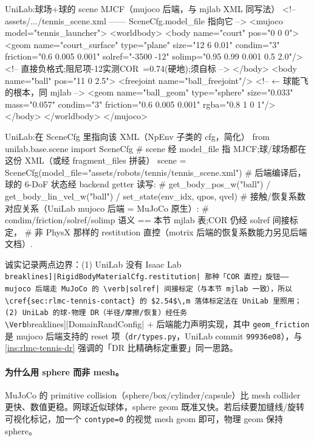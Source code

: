 \begin{codebox}[text]{UniLab:球场+球的 scene MJCF（mujoco 后端，与 mjlab XML 同写法）}
<!-- assets/.../tennis_scene.xml —— SceneCfg.model_file 指向它 -->
<mujoco model="tennis_launcher">
  <worldbody>
    <body name="court" pos="0 0 0">
      <geom name="court_surface" type="plane" size="12 6 0.01"
            condim="3" friction="0.6 0.005 0.001"
            solref="-3500 -12" solimp="0.95 0.99 0.001 0.5 2.0"/>  <!-- 直接负格式;阻尼项-12实测COR~=0.74(硬地);须自标 -->
    </body>
    <body name="ball" pos="11 0 2.5">
      <freejoint name="ball_freejoint"/>            <!-- ← 球能飞的根本，同 mjlab -->
      <geom name="ball_geom" type="sphere" size="0.033" mass="0.057"
            condim="3" friction="0.6 0.005 0.001" rgba="0.8 1 0 1"/>
    </body>
  </worldbody>
</mujoco>
\end{codebox}

\begin{codebox}[Python]{UniLab:在 SceneCfg 里指向该 XML（NpEnv 子类的 cfg，简化）}
from unilab.base.scene import SceneCfg
# scene 经 model_file 指 MJCF;球/球场都在这份 XML（或经 fragment_files 拼装）
scene = SceneCfg(model_file="assets/robots/tennis/tennis_scene.xml")
# 后端编译后，球的 6-DoF 状态经 backend getter 读写:
#   get_body_pos_w("ball") / get_body_lin_vel_w("ball") / set_state(env_idx, qpos, qvel)
# 接触/恢复系数对应关系（UniLab mujoco 后端 = MuJoCo 原生）:
#   condim/friction/solref/solimp 语义 == 本节 mjlab 表;COR 仍经 solref 间接标定，
#   非 PhysX 那样的 restitution 直控（motrix 后端的恢复系数能力另见后端文档）.
\end{codebox}

诚实记录两点边界：(1) UniLab 没有 Isaac Lab \Verb[breaklines]|RigidBodyMaterialCfg.restitution| 那种「COR 直控」旋钮——mujoco 后端走 MuJoCo 的 \verb|solref| 间接标定（与本节 mjlab 一致），所以 \cref{sec:rlmc-tennis-contact} 的 $2.54$\,m 落体标定法在 UniLab 里照用；(2) UniLab 的球-物理 DR（半径/摩擦/恢复）经任务 \Verb[breaklines]|DomainRandConfig| $+$ 后端能力声明实现，其中 \verb|geom_friction| 是 mujoco 后端支持的 reset 项（\verb|dr/types.py|，UniLab commit \texttt{99936e08}），与 \cref{ins:rlmc-tennis-dr} 强调的「DR 比精确标定重要」同一思路。

\paragraph{为什么用 sphere 而非 mesh。}MuJoCo 的 primitive collision（sphere/box/cylinder/capsule）比 mesh collider 更快、数值更稳。网球近似球体，sphere geom 既准又快。若后续要加缝线/旋转可视化标记，加一个 \verb|contype=0| 的视觉 mesh geom 即可，物理 geom 保持 sphere。

